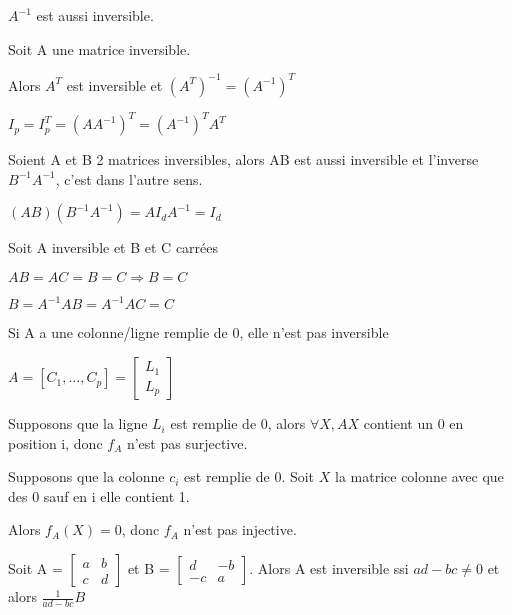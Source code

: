 \documentclass[french]{yLectureNote}
\begin{document}
\(A^{-1}\) est aussi inversible.
\begin{proposition}
Soit A une matrice inversible.

Alors \(A^T\) est inversible et \((A^T)^{-1} = (A^{-1})^T\)
\end{proposition}
\begin{myproof}
 \(I_p = I_p^T = (AA^{-1})^T=(A^{-1})^TA^T\)
\end{myproof}
\begin{proposition}
Soient A et B 2 matrices inversibles, alors AB est aussi inversible et l'inverse \(B^{-1}A^{-1}\), c'est dans l'autre sens.
\end{proposition}
\begin{myproof}
\((AB)(B^{-1}A^{-1}) = AI_d A^{-1} = I_d\)
\end{myproof}
\begin{proposition}
Soit A inversible et B et C carrées

\(AB=AC = B=C\Rightarrow B=C\)
\end{proposition}
\begin{myproof}
 \(B = A^{-1}AB = A^{-1}AC =C\)
\end{myproof}
\begin{proposition}
Si A a une colonne/ligne remplie de 0, elle n'est pas inversible
\end{proposition}
\begin{myproof}
 \(A = [C_1,\dots,C_p] = \begin{bmatrix}L_1\\L_p \end{bmatrix}\)

 Supposons que la ligne \(L_i\) est remplie de 0, alors \(\forall X, AX\) contient un 0 en position i, donc \(f_A\) n'est pas surjective.

 Supposons que la colonne \(c_i\) est remplie de 0. Soit \(X\) la matrice colonne avec que des 0 sauf en i elle contient 1.

 Alors \(f_A(X) = 0\), donc \(f_A\) n'est pas injective.
\end{myproof}
\begin{proposition}
Soit A = \(\begin{bmatrix}a&b\\c&d\end{bmatrix}\) et B =  \(\begin{bmatrix}d&-b\\-c&a\end{bmatrix}\). Alors A est inversible ssi \(ad-bc \neq 0\) et alors \(\frac{1}{ad-bc}B\)
\end{proposition}
\end{document}
